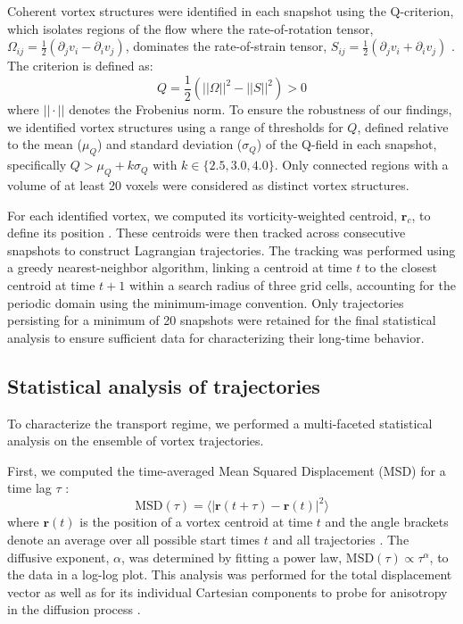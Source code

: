 \documentclass[]{article}
\begin{document}
Coherent vortex structures were identified in each snapshot using the Q-criterion, which isolates regions of the flow where the rate-of-rotation tensor, $\Omega_{ij} = \frac{1}{2}(\partial_j v_i - \partial_i v_j)$, dominates the rate-of-strain tensor, $S_{ij} = \frac{1}{2}(\partial_j v_i + \partial_i v_j)$ \citep{menon2021significancestraindominatedregionvortex}. The criterion is defined as:
\begin{equation}
Q = \frac{1}{2} \left( ||\Omega||^2 - ||S||^2 \right) > 0
\end{equation}
where $||\cdot||$ denotes the Frobenius norm. To ensure the robustness of our findings, we identified vortex structures using a range of thresholds for $Q$, defined relative to the mean ($\mu_Q$) and standard deviation ($\sigma_Q$) of the Q-field in each snapshot, specifically $Q > \mu_Q + k\sigma_Q$ with $k \in \{2.5, 3.0, 4.0\}$. Only connected regions with a volume of at least 20 voxels were considered as distinct vortex structures.

For each identified vortex, we computed its vorticity-weighted centroid, $\mathbf{r}_c$, to define its position \citep{kashyap2026emergencelocalorderinggiant}. These centroids were then tracked across consecutive snapshots to construct Lagrangian trajectories. The tracking was performed using a greedy nearest-neighbor algorithm, linking a centroid at time $t$ to the closest centroid at time $t+1$ within a search radius of three grid cells, accounting for the periodic domain using the minimum-image convention. Only trajectories persisting for a minimum of 20 snapshots were retained for the final statistical analysis to ensure sufficient data for characterizing their long-time behavior.

\subsection{Statistical analysis of trajectories}

To characterize the transport regime, we performed a multi-faceted statistical analysis on the ensemble of vortex trajectories.

First, we computed the time-averaged Mean Squared Displacement (MSD) for a time lag $\tau$ \citep{bailey2022logitfitactive}:
\begin{equation}
\text{MSD}(\tau) = \langle |\mathbf{r}(t+\tau) - \mathbf{r}(t)|^2 \rangle
\end{equation}
where $\mathbf{r}(t)$ is the position of a vortex centroid at time $t$ and the angle brackets denote an average over all possible start times $t$ and all trajectories \citep{katayama2025notetwopointmeansquare}. The diffusive exponent, $\alpha$, was determined by fitting a power law, $\text{MSD}(\tau) \propto \tau^\alpha$, to the data in a log-log plot. This analysis was performed for the total displacement vector as well as for its individual Cartesian components to probe for anisotropy in the diffusion process \citep{mcclure2026collectivevortexdynamicsisolated}.
\end{document}
